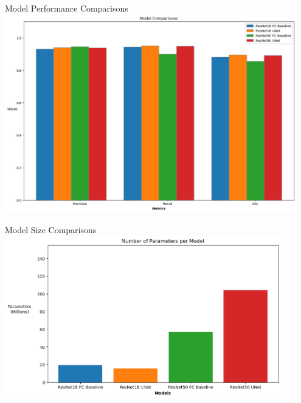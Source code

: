 \begin{frame}{Model Performance Comparisons}
    \centering
    \includegraphics[height=0.9\textheight,width=0.95\textwidth,keepaspectratio]{images/mm_performance.png}
\end{frame}

\begin{frame}{Model Size Comparisons}
    \centering
    \includegraphics[height=0.9\textheight,width=0.9\textwidth,keepaspectratio]{images/mm_params.png}
\end{frame}

